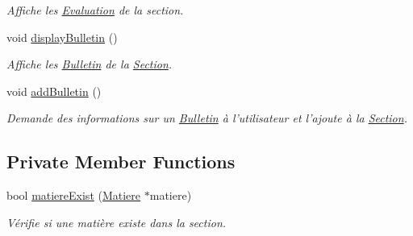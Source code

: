\begin{DoxyCompactItemize}
\begin{DoxyCompactList}\small\item\em Affiche les \hyperlink{class_evaluation}{Evaluation} de la section. \end{DoxyCompactList}\item 
\hypertarget{class_section_ac9097debb5e6a6f1931bf2d9753a2e6d}{void \hyperlink{class_section_ac9097debb5e6a6f1931bf2d9753a2e6d}{display\-Bulletin} ()}\label{class_section_ac9097debb5e6a6f1931bf2d9753a2e6d}

\begin{DoxyCompactList}\small\item\em Affiche les \hyperlink{class_bulletin}{Bulletin} de la \hyperlink{class_section}{Section}. \end{DoxyCompactList}\item 
\hypertarget{class_section_a68c3b681a7d9ebed80fb39009a8e2e64}{void \hyperlink{class_section_a68c3b681a7d9ebed80fb39009a8e2e64}{add\-Bulletin} ()}\label{class_section_a68c3b681a7d9ebed80fb39009a8e2e64}

\begin{DoxyCompactList}\small\item\em Demande des informations sur un \hyperlink{class_bulletin}{Bulletin} à l'utilisateur et l'ajoute à la \hyperlink{class_section}{Section}. \end{DoxyCompactList}\end{DoxyCompactItemize}
\subsection*{Private Member Functions}
\begin{DoxyCompactItemize}
\item 
bool \hyperlink{class_section_a60839a2ee0346cdcf24ac88ca96caf5d}{matiere\-Exist} (\hyperlink{class_matiere}{Matiere} $\ast$matiere)
\begin{DoxyCompactList}\small\item\em Vérifie si une matière existe dans la section. \end{DoxyCompactList}\end{DoxyCompactItemize}
